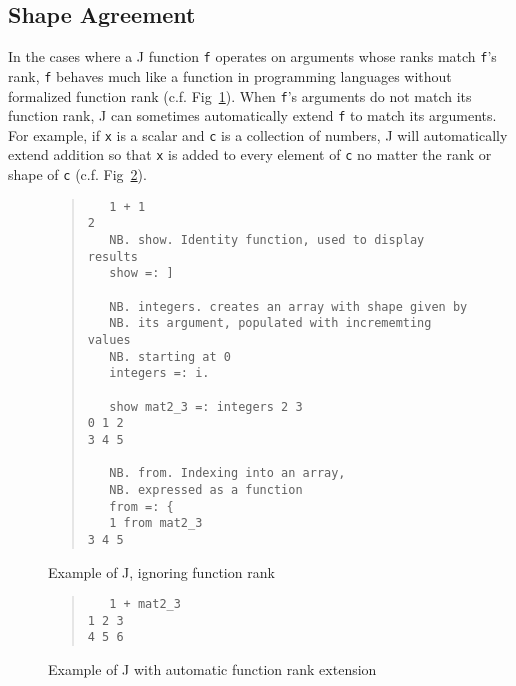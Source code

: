 \subsection{Shape Agreement}
In the cases where a J function \texttt{f} operates on arguments whose ranks match \texttt{f}'s rank, 
\texttt{f} behaves much like a function in programming languages without formalized function rank (c.f. Fig~\ref{fig:j-ig-fr}).
When \texttt{f}'s arguments do not match its function rank, 
J can sometimes automatically extend \texttt{f} to match its arguments.
For example, if \texttt{x} is a scalar and \texttt{c} is a collection of numbers, 
J will automatically extend addition so that \texttt{x} is added to every element of \texttt{c} no matter the rank or shape of \texttt{c} 
(c.f. Fig~\ref{fig:j-def-fr}).


\begin{figure}[htbp]
\begin{quote}
\HRule
\begin{singlespacing}
\begin{small}
\begin{verbatim}
   1 + 1
2
   NB. show. Identity function, used to display results
   show =: ] 

   NB. integers. creates an array with shape given by
   NB. its argument, populated with incrememting values
   NB. starting at 0
   integers =: i. 

   show mat2_3 =: integers 2 3
0 1 2
3 4 5

   NB. from. Indexing into an array, 
   NB. expressed as a function
   from =: { 
   1 from mat2_3
3 4 5
\end{verbatim}
\end{small}
\end{singlespacing}
\HRule
\end{quote}
\caption{Example of J, ignoring function rank}
\label{fig:j-ig-fr}
\end{figure}

\begin{figure}[htbp]
\begin{quote}
\HRule
\begin{singlespacing}
\begin{small}
\begin{verbatim}
   1 + mat2_3
1 2 3
4 5 6
\end{verbatim}
\end{small}
\end{singlespacing}
\HRule
\caption{Example of J with automatic function rank extension}
\label{fig:j-def-fr}
\end{quote}
\end{figure}


